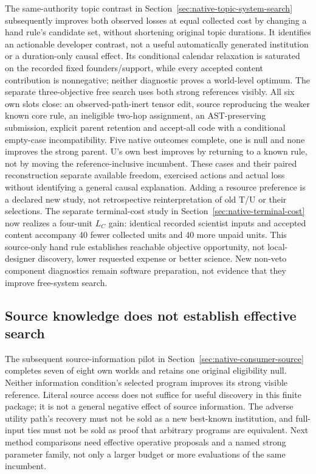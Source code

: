 The same-authority topic contrast in Section~\ref{sec:native-topic-system-search}
subsequently improves both observed losses at equal collected cost by changing
a hand rule's candidate set, without shortening original topic durations.
It identifies an actionable developer contrast, not a useful automatically
generated institution or a duration-only causal effect. Its conditional calendar
relaxation is saturated on the recorded fixed founders/support, while every
accepted content contribution is nonnegative; neither diagnostic proves a
world-level optimum. The separate three-objective free search uses both strong
references visibly. All six own slots close: an observed-path-inert tensor
edit, source reproducing the weaker known core rule, an ineligible two-hop
assignment, an AST-preserving submission, explicit parent retention and
accept-all code with a conditional empty-case incompatibility.
Five native outcomes complete, one is null and none improves the strong
parent. U's own best improves by returning to a known rule, not by moving the
reference-inclusive incumbent. These cases and their paired reconstruction
separate available freedom, exercised actions and actual loss without
identifying a general causal explanation. Adding a resource
preference is a declared new study, not retrospective reinterpretation of old
T/U or their selections. The separate terminal-cost study in
Section~\ref{sec:native-terminal-cost} now realizes a four-unit $L_C$ gain:
identical recorded scientist inputs and accepted content accompany 40 fewer
collected units and 40 more unpaid units. This source-only hand rule establishes
reachable objective opportunity, not local-designer discovery, lower requested
expense or better science. New non-veto component diagnostics remain software
preparation, not evidence that they improve free-system search.

\subsection{Source knowledge does not establish effective search}
The subsequent source-information pilot in
Section~\ref{sec:native-consumer-source} completes seven of eight own worlds
and retains one original eligibility null. Neither information condition's
selected program improves its strong visible reference. Literal source access
does not suffice for useful discovery in this finite package; it is not a
general negative effect of source information. The adverse utility path's
recovery must not be sold as a new best-known institution, and full-input ties
must not be sold as proof that arbitrary programs are equivalent. Next method
comparisons need effective operative proposals and a named strong parameter
family, not only a larger budget or more evaluations of the same incumbent.

